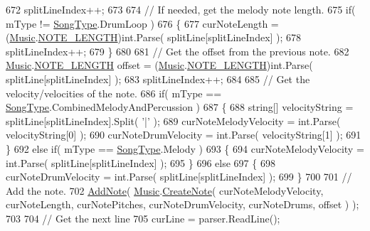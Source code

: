 \begin{DoxyCodeInclude}
672             splitLineIndex++;
673 
674             \textcolor{comment}{// If needed, get the melody note length.}
675             \textcolor{keywordflow}{if}( mType != \hyperlink{group___song_enums_gae681a1f001333e39fc1cb4fea97bfe1b}{SongType}.DrumLoop )
676             \{
677                 curNoteLength = (\hyperlink{class_music}{Music}.\hyperlink{group___music_enums_gaf11b5f079adbb21c800b9eca1c5c3cbd}{NOTE\_LENGTH})\textcolor{keywordtype}{int}.Parse( splitLine[splitLineIndex] );
678                 splitLineIndex++;
679             \}
680 
681             \textcolor{comment}{// Get the offset from the previous note.}
682             \hyperlink{class_music}{Music}.\hyperlink{group___music_enums_gaf11b5f079adbb21c800b9eca1c5c3cbd}{NOTE\_LENGTH} offset = (\hyperlink{class_music}{Music}.\hyperlink{group___music_enums_gaf11b5f079adbb21c800b9eca1c5c3cbd}{NOTE\_LENGTH})\textcolor{keywordtype}{int}.Parse( 
      splitLine[splitLineIndex] );
683             splitLineIndex++;
684 
685             \textcolor{comment}{// Get the velocity/velocities of the note.}
686             \textcolor{keywordflow}{if}( mType == \hyperlink{group___song_enums_gae681a1f001333e39fc1cb4fea97bfe1b}{SongType}.CombinedMelodyAndPercussion )
687             \{
688                 \textcolor{keywordtype}{string}[] velocityString = splitLine[splitLineIndex].Split( \textcolor{charliteral}{'|'} );
689                 curNoteMelodyVelocity = \textcolor{keywordtype}{int}.Parse( velocityString[0] );
690                 curNoteDrumVelocity = \textcolor{keywordtype}{int}.Parse( velocityString[1] );
691             \}
692             \textcolor{keywordflow}{else} \textcolor{keywordflow}{if}( mType == \hyperlink{group___song_enums_gae681a1f001333e39fc1cb4fea97bfe1b}{SongType}.Melody )
693             \{
694                 curNoteMelodyVelocity = \textcolor{keywordtype}{int}.Parse( splitLine[splitLineIndex] );
695             \}
696             \textcolor{keywordflow}{else}
697             \{
698                 curNoteDrumVelocity = \textcolor{keywordtype}{int}.Parse( splitLine[splitLineIndex] );
699             \}
700 
701             \textcolor{comment}{// Add the note.}
702             \hyperlink{group___song_pub_func_gab7c8fe4dc29f5ae7b7728c583fe51f7e}{AddNote}( \hyperlink{class_music}{Music}.\hyperlink{group___music_stat_func_gaaf74885e43eb623f64f961985fadcd08}{CreateNote}( curNoteMelodyVelocity, curNoteLength, 
      curNotePitches, curNoteDrumVelocity, curNoteDrums, offset ) );
703 
704             \textcolor{comment}{// Get the next line}
705             curLine = parser.ReadLine();

\end{DoxyCodeInclude}
